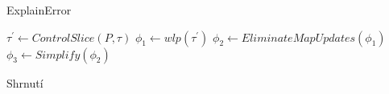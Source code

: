 \documentclass[11pt]{beamer}
\newtheorem{dfn}{Definice}
\begin{document}
\begin{frame}{ExplainError}
\begin{algorithmic} \small
\State $\tau^\prime \gets \textit{ControlSlice}(P, \tau)$
\State $\phi_1 \gets \textit{wlp}(\tau^\prime)$
\State $\phi_2 \gets \textit{EliminateMapUpdates}(\phi_1)$
\State $\phi_3 \gets \textit{Simplify}(\phi_2)$

\end{algorithmic}
\end{frame}

\begin{frame}{Shrnutí}

\end{frame}


%
%
%

%
%
%
%

%
%
\end{document}
